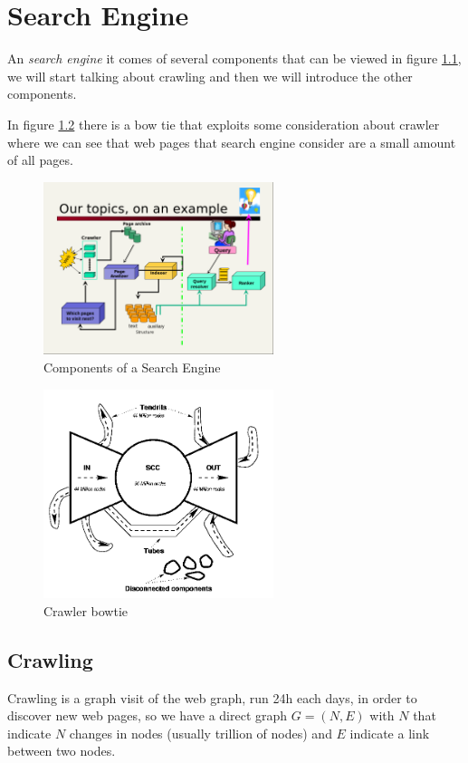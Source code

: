 \chapter{Search Engine}
An \emph{search engine} it comes of several components that can be viewed in figure \ref{img:searchEngine},
we will start talking about crawling and then we will introduce the other components.

In figure \ref{img:bowTie} there is a bow tie that exploits some consideration about crawler where
we can see that web pages that search engine consider are a small amount of all pages. 

\begin{figure}
	\includegraphics[width=0.6\textwidth]{Images/searchEngine}
	\caption{Components of a Search Engine}
	\label{img:searchEngine}
\end{figure}

\begin{figure}
	\includegraphics[width=0.6\textwidth]{Images/bowTie}
	\caption{Crawler bowtie}
	\label{img:bowTie}
\end{figure}

\section{Crawling}
Crawling is a graph visit of the web graph, run 24h each days, in order to discover new web pages, so we 
have a direct graph $G = (N, E)$ with $N$ that indicate $N$ changes in nodes (usually trillion of nodes) and
$E$ indicate a link between two nodes.

